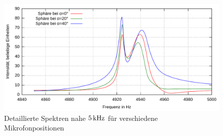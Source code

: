 \documentclass[numbers=noenddot,12pt,a4paper]{scrartcl}
\begin{document}
\begin{figure}[H]
	\includegraphics[width=\textwidth]{messwerte/sphaerendetailiertesspektrum.pdf}
	\caption{Detaillierte Spektren nahe $\unit[5]{kHz}$ für verschiedene Mikrofonpositionen}\label{img:detail}
\end{figure}
\end{document}
